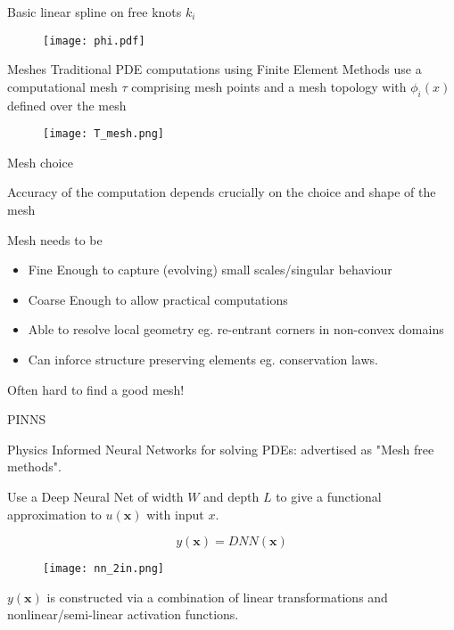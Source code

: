 \documentclass{beamer}
\begin{document}
\begin{frame}{Basic linear spline on free knots $k_i$}

 \begin{figure}
    \centering
    \texttt{[image: phi.pdf]}
    \end{figure}

\end{frame}
\begin{frame}{Meshes}
Traditional PDE computations using {\color{red} Finite Element Methods} use a {\color{blue}computational mesh} $\tau$ comprising mesh points and a mesh topology with $\phi_i(x)$ defined over the mesh
  \begin{figure}
    \texttt{[image: T\_mesh.png]}
  \end{figure}

\end{frame}

\begin{frame}{Mesh choice}
    

{\color{red} Accuracy of the computation depends crucially on the choice and shape of the mesh} 

\vspace{0.2in}

Mesh needs to be 

\vspace{0.1in}

\begin{itemize}
\item {\color{blue} Fine Enough} to capture (evolving) small scales/singular behaviour 
\item {\color{blue} Coarse Enough} to allow practical computations
\item Able to resolve local geometry eg. re-entrant corners in non-convex domains
\item Can inforce structure preserving elements eg. conservation laws.
\end{itemize}

{\color{red} Often hard to find a good mesh!}

\end{frame}



\begin{frame}{PINNS}

Physics Informed Neural Networks for solving PDEs: advertised as {\color{blue} "Mesh free methods"}.

Use a Deep Neural Net of width $W$ and depth $L$ to give a {\color{red} functional approximation} to $u({\mathbf x})$ with {\color {blue} input} $x$.

{\color{purple} $$y({\mathbf x}) = DNN({\mathbf x})$$}

\begin{figure}
    \centering
    \texttt{[image: nn\_2in.png]}
    \label{fig:dnn_example}
\end{figure}

$y({\mathbf x})$ is constructed via a combination of linear transformations and nonlinear/semi-linear activation functions.

\end{frame}
\end{document}
